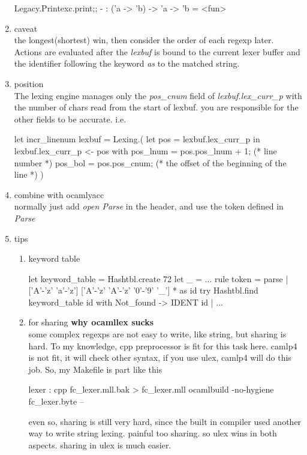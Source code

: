 \begin{enumerate}
\begin{alternate}
Legacy.Printexc.print;;
- : ('a -> 'b) -> 'a -> 'b = <fun>  
\end{alternate}
\item caveat \\
  the longest(shortest) win, then consider the order of each regexp
  later.
  Actions are evaluated after the \textit{lexbuf} is bound to the
  current lexer buffer and the identifier following the keyword
  \textit{as} to the matched string.
\item position \\
  The lexing engine manages only the \textit{pos\_cnum} field of
  \textit{lexbuf.lex\_curr\_p} with the number of chars read from the
  start of lexbuf. you are responsible for the other fields to be
  accurate.
  i.e.
  \begin{bluetext}
let incr_linenum lexbuf = Lexing.(
    let pos = lexbuf.lex_curr_p in
    lexbuf.lex_curr_p <- { pos with
      pos_lnum = pos.pos_lnum + 1; (* line number *)
     pos_bol = pos.pos_cnum; (* the offset of the beginning of the
     line *)
    })    
  \end{bluetext}

\item combine with ocamlyacc \\
normally  just add \textit{open Parse} in the header, and use the
token defined in \textit{Parse}

\item tips \\
  \begin{enumerate}
  \item keyword table
    \begin{bluetext}
      {let keyword_table = Hashtbl.create 72
       let _ = ...
     }
     rule token = parse
     | ['A'-'z' 'a'-'z'] ['A'-'z' 'A'-'z' '0'-'9' '_'] * as id
     {try Hashtbl.find keyword_table id with Not_found -> IDENT id}
     | ... 
    \end{bluetext}
  \item for sharing \textbf{why ocamllex sucks}\\
    some complex regexps are not easy to write, like string, but sharing
    is hard. To my knowledge, cpp preprocessor is fit for this task here.
    camlp4 is not fit, it will check other syntax, if you use ulex, camlp4
    will do this job.
    So, my Makefile is part like this
    \begin{bluetext}
lexer : 
	cpp fc_lexer.mll.bak > fc_lexer.mll 
	ocamlbuild -no-hygiene fc_lexer.byte --       
    \end{bluetext}
    even so, sharing is still very hard, since the built in compiler used another way to write string lexing. painful too sharing. so ulex wins in both aspects.
    sharing in ulex is much easier.
  \end{enumerate}

  
\end{enumerate}


